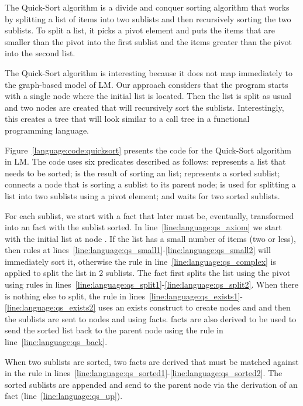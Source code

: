The Quick-Sort algorithm is a divide and conquer sorting algorithm that works by
splitting a list of items into two sublists and then recursively sorting the two
sublists. To split a list, it picks a pivot element and puts the items that are
smaller than the pivot into the first sublist and the items greater than the pivot
into the second list.

The Quick-Sort algorithm is interesting because it does not map immediately to
the graph-based model of LM. Our approach considers that the program starts with
a single node where the initial list is located. Then the list is split as usual
and two nodes are created that will recursively sort the sublists.
Interestingly, this creates a tree that will look similar to a call tree in a
functional programming language.

Figure~\ref{language:code:quicksort} presents the code for the Quick-Sort
algorithm in LM. The code uses six predicates described as follows: 
represents a list that needs to be sorted;  is the result of sorting
an  list;  represents a sorted sublist; 
connects a node that is sorting a sublist to its parent node;  is
used for splitting a list into two sublists using a pivot element; and
 waits for two sorted sublists.

For each sublist, we start with a  fact that later
must be, eventually, transformed into an  fact with the sublist sorted.
In line~\ref{line:language:qs_axiom} we start with the initial list at node
. If the list has a small number of items (two or less), then rules at
lines~\ref{line:language:qs_small1}-\ref{line:language:qs_small2} will
immediately sort it, otherwise the rule in line~\ref{line:language:qs_complex}
is applied to split the list in 2 sublists. The fact  first splits
the list using the pivot  using rules in
lines~\ref{line:language:qs_split1}-\ref{line:language:qs_split2}.  When there
is nothing else to split, the rule in
lines~\ref{line:language:qs_exists1}-\ref{line:language:qs_exists2} uses an
exists construct to create nodes  and  and then the sublists are
sent to nodes  and  using  facts.   facts
are also derived to be used to send the sorted list back to the parent node
using the rule in line~\ref{line:language:qs_back}.

When two sublists are sorted, two  facts are derived that must be
matched against  in the rule in
lines~\ref{line:language:qs_sorted1}-\ref{line:language:qs_sorted2}. The sorted
sublists are appended and send  to the parent node via the derivation
of an  fact (line~\ref{line:language:qs_up}).

